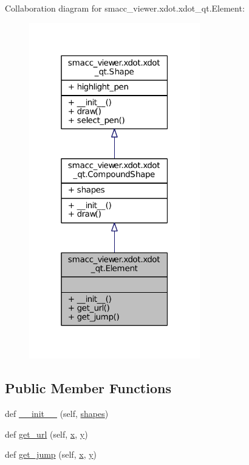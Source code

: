 Collaboration diagram for smacc\+\_\+viewer.\+xdot.\+xdot\+\_\+qt.\+Element\+:
\nopagebreak
\begin{figure}[H]
\begin{center}
\leavevmode
\includegraphics[width=211pt]{classsmacc__viewer_1_1xdot_1_1xdot__qt_1_1Element__coll__graph}
\end{center}
\end{figure}
\subsection*{Public Member Functions}
\begin{DoxyCompactItemize}
\item 
def \hyperlink{classsmacc__viewer_1_1xdot_1_1xdot__qt_1_1Element_a19191e3030a70c0199573364a0eb0d88}{\+\_\+\+\_\+init\+\_\+\+\_\+} (self, \hyperlink{classsmacc__viewer_1_1xdot_1_1xdot__qt_1_1CompoundShape_ad2f848b99323a9a844ffa4769737f69e}{shapes})
\item 
def \hyperlink{classsmacc__viewer_1_1xdot_1_1xdot__qt_1_1Element_ae2e828c1f21bbe2c50ce591ce00d33d3}{get\+\_\+url} (self, \hyperlink{namespacesmacc__viewer_1_1xdot_1_1xdot__qt_a1dd3d4e1f636ed9ebbed9b32d4c196df}{x}, \hyperlink{namespacesmacc__viewer_1_1xdot_1_1xdot__qt_a784c76c541d5dd5940e217a1aa54f256}{y})
\item 
def \hyperlink{classsmacc__viewer_1_1xdot_1_1xdot__qt_1_1Element_a1cd72f60833bf824c7dcbad78b63aaec}{get\+\_\+jump} (self, \hyperlink{namespacesmacc__viewer_1_1xdot_1_1xdot__qt_a1dd3d4e1f636ed9ebbed9b32d4c196df}{x}, \hyperlink{namespacesmacc__viewer_1_1xdot_1_1xdot__qt_a784c76c541d5dd5940e217a1aa54f256}{y})
\end{DoxyCompactItemize}
